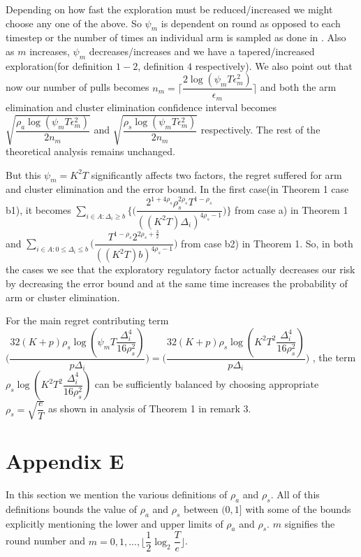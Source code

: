	Depending on how fast the exploration must be reduced/increased we might choose any one of the above. So $\psi_{m}$ is dependent on round as opposed to each timestep or the number of times an individual arm is sampled as done in \cite{liu2016modification}. Also as $m$ increases, $\psi_{m}$ decreases/increases and we have a tapered/increased exploration(for definition $1-2$, definition $4$ respectively). We also point out that now our number of pulls becomes $n_{m}=\bigg\lceil\dfrac{2\log{(\psi_{m}T\epsilon_{m}^{2})}}{\epsilon_{m}}\bigg\rceil$ and both the arm elimination and cluster elimination confidence interval becomes $\sqrt{\dfrac{\rho_{a}\log{(\psi_{m}T\epsilon_{m}^{2})}}{2 n_{m}}}$ and $\sqrt{\dfrac{\rho_{s} \log{(\psi_{m}T\epsilon_{m}^{2})}}{2 n_{m}}}$  respectively. The rest of the theoretical analysis remains unchanged. 
	
	But this $\psi_{m}=K^{2}T$ significantly affects two factors, the regret suffered for arm and cluster elimination and the error bound. In the first case(in Theorem 1 case b1), it becomes $ \sum_{i\in A:\Delta_{i}\geq b}\bigg\lbrace\bigg(\dfrac{2^{1+4\rho_{s}}\rho_{s}^{2\rho_{s}}T^{1-\rho_{s}}}{((K^{2}T)\Delta_{i})^{4\rho_{s}-1}}\bigg)\bigg\rbrace$ from case a) in Theorem 1 and $\sum_{i\in A:0\leq \Delta_{i}\leq b} \bigg(\dfrac{T^{1-\rho_{s}}2^{2\rho_{s}+\frac{3}{2}}}{(( K^{2}T) b)^{4\rho_{s} -1}} \bigg)$ from case b2) in Theorem 1. So, in both the cases we see that the exploratory regulatory factor actually decreases our risk by decreasing the error bound and at the same time increases the probability of arm or cluster elimination.
	
	For the main regret contributing term $\bigg(\dfrac{32(K+p)\rho_{s}\log{(\psi_{m}T\dfrac{\Delta_{i}^{4}}{16\rho_{s}^{2}})}}{p\Delta_{i}}\bigg) = \bigg(\dfrac{32(K+p)\rho_{s}\log{(K^{2}T^{2}\dfrac{\Delta_{i}^{4}}{16\rho_{s}^{2}})}}{p\Delta_{i}}\bigg)$ , the term $\rho_{s}\log{(K^{2}T^{2}\dfrac{\Delta_{i}^{4}}{16\rho_{s}^{2}})}$ can be sufficiently balanced by choosing appropriate $\rho_{s}=\sqrt{\dfrac{e}{T}}$ as shown in analysis of Theorem 1 in remark 3.

\section{Appendix E}

In this section we mention the various definitions of $\rho_{a}$ and $\rho_{s}$. All of this definitions bounds the value of $\rho_{a}$ and $\rho_{s}$ between $(0,1]$ with some of the bounds explicitly mentioning the lower and upper limits of $\rho_{a}$ and $\rho_{s}$. $m$ signifies the round number and $m=0,1,...,\big \lfloor \dfrac{1}{2}\log_{2} \dfrac{T}{e}\big\rfloor$.

